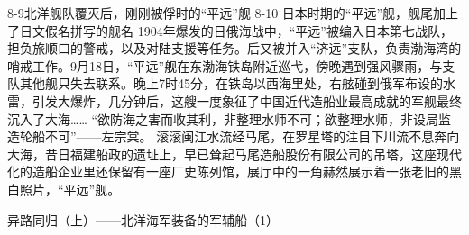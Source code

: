 \documentclass[12pt,UTF8]{ctexbook}
\begin{document}
8-9北洋舰队覆灭后，刚刚被俘时的“平远”舰
8-10 日本时期的“平远”舰，舰尾加上了日文假名拼写的舰名
1904年爆发的日俄海战中，“平远”被编入日本第七战队，担负旅顺口的警戒，以及对陆支援等任务。后又被并入“济远”支队，负责渤海湾的哨戒工作。9月18日，“平远”舰在东渤海铁岛附近巡弋，傍晚遇到强风骤雨，与支队其他舰只失去联系。晚上7时45分，在铁岛以西海里处，右舷碰到俄军布设的水雷，引发大爆炸，几分钟后，这艘一度象征了中国近代造船业最高成就的军舰最终沉入了大海……
“欲防海之害而收其利，非整理水师不可；欲整理水师，非设局监造轮船不可”——左宗棠。
滚滚闽江水流经马尾，在罗星塔的注目下川流不息奔向大海，昔日福建船政的遗址上，早已耸起马尾造船股份有限公司的吊塔，这座现代化的造船企业里还保留有一座厂史陈列馆，展厅中的一角赫然展示着一张老旧的黑白照片，“平远”舰。




异路同归（上）——北洋海军装备的军辅船（1）
\end{document}
